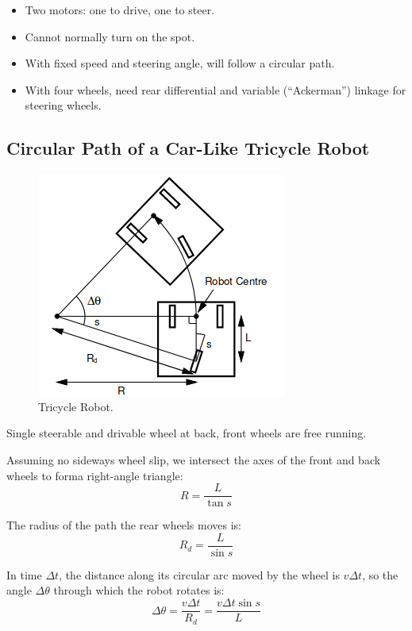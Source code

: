 \documentclass[11pt]{article}
\begin{document}
\begin{itemize}
  \item Two motors: one to drive, one to steer.
  \item Cannot normally turn on the spot.
  \item With fixed speed and steering angle, will follow a circular path.
  \item With four wheels, need rear differential and variable (``Ackerman'') linkage for steering wheels.
\end{itemize}

\subsection{Circular Path of a Car-Like Tricycle Robot}
\begin{figure}[h]
  \caption{Tricycle Robot.}
  \includegraphics[scale=0.4]{tricycle}
  \centering
\end{figure}

Single steerable and drivable wheel at back, front wheels are free running.

Assuming no sideways wheel slip, we intersect the axes of the front and back wheels to forma right-angle triangle:
\[
  R = \frac{L}{\tan s}
\]

The radius of the path the rear wheels moves is:
\[
  R_d = \frac{L}{\sin s}
\]

In time $\Delta t$, the distance along its circular arc moved by the wheel is $v\Delta t$, so the angle $\Delta \theta$ through which the robot rotates is:
\[
  \Delta \theta = \frac{v\Delta t}{R_d} = \frac{v\Delta t \sin s}{L}
\]
\end{document}
